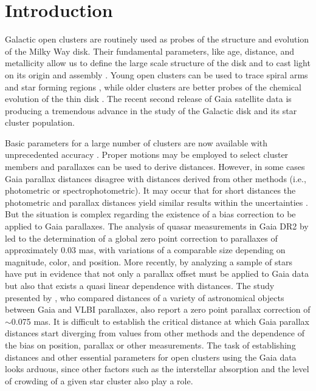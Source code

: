 \documentclass[draft]{aa}
\begin{document}
\section{Introduction}

Galactic open clusters are routinely used as probes of the structure and
evolution of the Milky Way disk. Their fundamental parameters, like age,
distance, and metallicity allow us to define the large scale structure of the
disk and to cast light on its origin and assembly \citep{Janes_1982,
Moitinho_2010,2018A&A...618A..93C}. Young open clusters can be used to trace
spiral arms and star forming regions \citep{Moitinho_2006,Vazquez2008}, while
older clusters are better probes of the chemical evolution of the thin disk
\citep{2009yCat..35120063M}. The recent second release of Gaia satellite data
\citep{GaiaDR2_2018} is producing a tremendous advance in the study of the
Galactic disk and its star cluster population.

Basic parameters for a large number of clusters are now available with
unprecedented accuracy \citep{2018A&A...618A..93C,Soubiran_2018,Bossini_2019,
Monteiro_2019}. Proper motions may be employed to select cluster members and
parallaxes can be used to derive distances. However, in some cases Gaia
parallax distances disagree with distances derived from other methods 
(i.e., photometric or spectrophotometric). It may occur that for
short distances the photometric and parallax distances yield similar results
within the uncertainties \citep{2018A&A...618A..93C}. But the situation is
complex regarding the existence of a bias correction to be applied to
Gaia parallaxes. The analysis of quasar measurements in Gaia DR2 by
\cite{Lindegren_2018} led to the determination of a global zero point
correction to parallaxes of approximately 0.03 mas, with variations of a
comparable size depending on magnitude, color, and position.
More recently, by analyzing a sample of stars \cite{Schonrich2019} have put in
evidence that not only a parallax offset must be applied to Gaia data but also
that exists a quasi linear dependence with distances. The study presented by 
\cite{Xu_2019}, who compared distances of a variety of astronomical objects
between Gaia and VLBI parallaxes, also report a zero point parallax correction
of $\sim$0.075 mas.
It is difficult to establish the critical distance at which Gaia parallax
distances start diverging from values from other methods and the dependence of
the bias on position, parallax or other measurements. The  task of
establishing distances and other essential parameters for open clusters using
the Gaia data looks arduous, since other factors such as the interstellar
absorption and the level of crowding of a given star cluster also play a
role.
\end{document}
